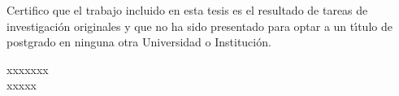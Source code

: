 


\setcounter{tocdepth}{5}

%

%

\renewcommand{\tablename}{Tabla}
\renewcommand{\listtablename}{{\'I}ndice de tablas}


\thispagestyle{empty}%
Certifico que el trabajo incluido en esta tesis es el resultado de tareas de investigaci{\'o}n originales y que no ha sido presentado para optar a un t{\'\i}tulo de postgrado en ninguna otra
Universidad o Instituci{\'o}n.\\
\vspace{0.5cm}
\begin{flushright}
\large{}\selectfont
xxxxxxx\\
\normalsize\sffamily
xxxxx
\end{flushright}

%

%

%
%
    
\tableofcontents



\renewcommand{\baselinestretch}{1.2} %



